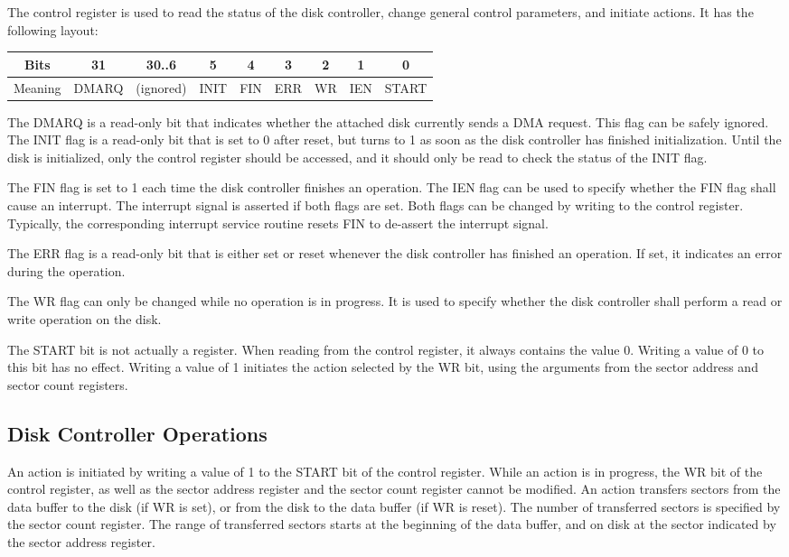 The control register is used to read the status of the disk controller, change general control parameters, and initiate actions. It has the following layout:

\begin{tabular}{|c|c|c|c|c|c|c|c|c|}
\hline
Bits & 31 & 30..6 & 5 & 4 & 3 & 2 & 1 & 0\\
\hline
Meaning & DMARQ & (ignored) & INIT & FIN & ERR & WR & IEN & START\\
\hline
\end{tabular}

The DMARQ is a read-only bit that indicates whether the attached disk currently sends a DMA request. This flag can be safely ignored. The INIT flag is a read-only bit that is set to 0 after reset, but turns to 1 as soon as the disk controller has finished initialization. Until the disk is initialized, only the control register should be accessed, and it should only be read to check the status of the INIT flag.

The FIN flag is set to 1 each time the disk controller finishes an operation. The IEN flag can be used to specify whether the FIN flag shall cause an interrupt. The interrupt signal is asserted if both flags are set. Both flags can be changed by writing to the control register. Typically, the corresponding interrupt service routine resets FIN to de-assert the interrupt signal.

The ERR flag is a read-only bit that is either set or reset whenever the disk controller has finished an operation. If set, it indicates an error during the operation.

The WR flag can only be changed while no operation is in progress. It is used to specify whether the disk controller shall perform a read or write operation on the disk.

The START bit is not actually a register. When reading from the control register, it always contains the value 0. Writing a value of 0 to this bit has no effect. Writing a value of 1 initiates the action selected by the WR bit, using the arguments from the sector address and sector count registers.

\subsection{Disk Controller Operations}

An action is initiated by writing a value of 1 to the START bit of the control register. While an action is in progress, the WR bit of the control register, as well as the sector address register and the sector count register cannot be modified. An action transfers sectors from the data buffer to the disk (if WR is set), or from the disk to the data buffer (if WR is reset). The number of transferred sectors is specified by the sector count register. The range of transferred sectors starts at the beginning of the data buffer, and on disk at the sector indicated by the sector address register.

